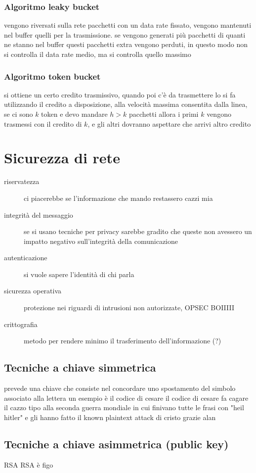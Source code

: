 \documentclass[11pt]{article}
\begin{document}
\subsubsection{Algoritmo leaky bucket}
\label{sec:orgb0d7833}
vengono riversati sulla rete pacchetti con un data rate fissato, vengono mantenuti nel buffer quelli per la trasmissione.
se vengono generati più pacchetti di quanti ne stanno nel buffer questi pacchetti extra vengono perduti, in questo modo non si controlla il data rate medio, ma si controlla quello massimo

\subsubsection{Algoritmo token bucket}
\label{sec:org3bc99bf}
si ottiene un certo credito trasmissivo, quando poi c'è da trasmettere lo si fa utilizzando il credito a disposizione, alla velocità massima consentita dalla linea, se ci sono \(k\) token e devo mandare \(h>k\) pacchetti allora i primi \(k\) vengono trasmessi con il credito di \(k\), e gli altri dovranno aspettare che arrivi altro credito

\section{Sicurezza di rete}
\label{sec:org9c4453d}
\begin{description}
\item[{riservatezza}] ci piacerebbe se l'informazione che mando restassero cazzi mia
\item[{integrità del messaggio}] se si usano tecniche per privacy sarebbe gradito che queste non avessero un impatto negativo sull'integrità della comunicazione
\item[{autenticazione}] si vuole sapere l'identità di chi parla
\item[{sicurezza operativa}] protezione nei riguardi di intrusioni non autorizzate, OPSEC BOIIIII
\item[{crittografia}] metodo per rendere minimo il trasferimento dell'informazione (?)
\end{description}

\subsection{Tecniche a chiave simmetrica}
\label{sec:orgeab2d08}
prevede una chiave che consiste nel concordare uno spostamento del simbolo associato alla lettera
un esempio è il codice di cesare
il codice di cesare fa cagare il cazzo
tipo alla seconda guerra mondiale in cui finivano tutte le frasi con "heil hitler" e gli hanno fatto il known plaintext attack di cristo
grazie alan

\subsection{Tecniche a chiave asimmetrica (public key)}
\label{sec:orgfb1d311}
RSA
RSA è figo
\end{document}
